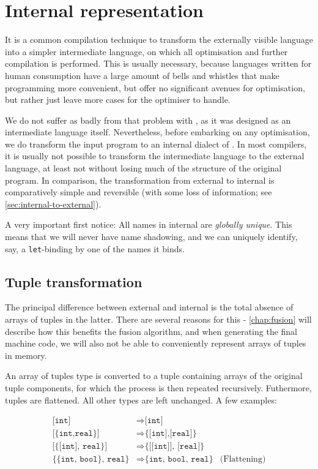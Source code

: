 \chapter{Internal representation}
\label{chap:internal}

It is a common compilation technique to transform the externally
visible language into a simpler intermediate language, on which all
optimisation and further compilation is performed.  This is usually
necessary, because languages written for human consumption have a
large amount of bells and whistles that make programming more
convenient, but offer no significant avenues for optimisation, but
rather just leave more cases for the optimiser to handle.

We do not suffer as badly from that problem with \LO{}, as it was
designed as an intermediate language itself.  Nevertheless, before
embarking on any optimisation, we do transform the input program to an
internal dialect of \LO{}.  In most compilers, it is usually not
possible to transform the intermediate language to the external
language, at least not without losing much of the structure of the
original program.  In comparison, the transformation from external to
internal \LO{} is comparatively simple and reversible (with some loss
of information; see \cref{sec:internal-to-external}).

A very important first notice: All names in internal \LO{} are
\textit{globally unique}.  This means that we will never have name
shadowing, and we can uniquely identify, say, a \texttt{let}-binding
by one of the names it binds.

\section{Tuple transformation}
\label{sec:tuple-transformation}

The principal difference between external and internal \LO{} is the
total absence of arrays of tuples in the latter.  There are several
reasons for this - \cref{chap:fusion} will describe how this benefits
the fusion algorithm, and when generating the final machine code, we
will also not be able to conveniently represent arrays of tuples in
memory.

An array of tuples type is converted to a tuple containing arrays of
the original tuple components, for which the process is then repeated
recursively.  Futhermore, tuples are flattened.  All other types are
left unchanged.  A few examples:

\begin{align*}
\texttt{[int]} &\Rightarrow \texttt{[int]} \\
\texttt{[\{int,real\}]} &\Rightarrow \texttt{\{[int],[real]\}} \\
\texttt{[\{[int], real\}]} &\Rightarrow \texttt{\{[[int]], [real]\}} \\
\texttt{\{\{int, bool\}, real\}} &\Rightarrow \texttt{\{int, bool, real\}} & \text{(Flattening)} \\
\end{align*}

